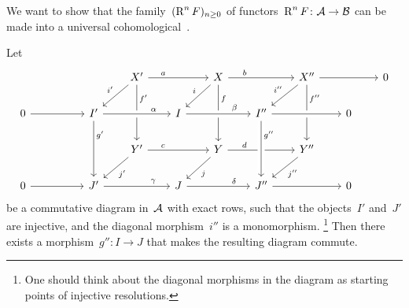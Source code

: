 \begin{goalnonum}
  We want to show that the family~$(\operatorname{R}^n F)_{n \geq 0}$ of functors~$\operatorname{R}^n F \colon \mathcal{A} \to \mathcal{B}$ can be made into a universal cohomological~{\deltafun}.
\end{goalnonum}


\begin{lemmanonum}
  Let
  \[
    \begin{tikzcd}[column sep = 2em]
        {}
      & {}
      & {}
      & X'
        \arrow{rr}[above, near start]{a}
        \arrow{dl}[above left]{i'}
        \arrow{dd}[right, near start]{f'}
      & {}
      & X
        \arrow{rr}[above, near start]{b}
        \arrow{dl}[above left]{i}
        \arrow{dd}[right, near start]{f}
      & {}
      & X''
        \arrow{rr}
        \arrow{dl}[above left]{i''}
        \arrow{dd}[right, near start]{f''}
      & {}
      & 0
      \\
        0
        \arrow{rr}
      & {}
      & I'
        \arrow{dd}[right, near start]{g'}
      & {}
      & I
        \arrow[from=ll, crossing over, "\alpha", near end]
      & {}
      & I''
        \arrow[from=ll, crossing over, "\beta", near end]
      & {}
      & 0
        \arrow[from=ll, crossing over]
      & {}
      \\
        {}
      & {}
      & {}
      & Y'
        \arrow{rr}[above, near start]{c}
        \arrow{dl}[below right]{j'}
      & {}
      & Y
        \arrow{rr}[above, near start]{d}
        \arrow{dl}[below right]{j}
      & {}
      & Y''
        \arrow{dl}[below right]{j''}
      & {}
      & {}
      \\
        0
        \arrow{rr}
      & {}
      & J'
        \arrow{rr}[above, near end]{\gamma}
      & {}
      & J
        \arrow{rr}[above, near end]{\delta}
      & {}
      & J''
        \arrow[from=uu, crossing over, "g''", near start]
        \arrow{rr}
      & {}
      & 0
      & {}
    \end{tikzcd}
  \]
  be a commutative diagram in~$\mathcal{A}$ with exact rows, such that the objects~$I'$ and~$J'$ are injective, and the diagonal morphism~$i''$ is a monomorphism.%
  \footnote{One should think about the diagonal morphisms in the diagram as starting points of injective resolutions.}
  Then there exists a morphism~$g'' \colon I \to J$ that makes the resulting diagram commute.
\end{lemmanonum}


